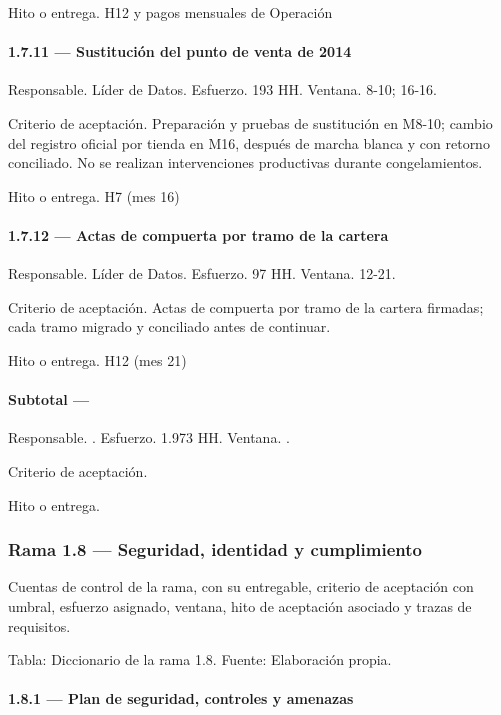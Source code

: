\documentclass[11pt]{article}
\begin{document}
Hito o entrega. H12 y pagos mensuales de Operación

\paragraph{1.7.11 — Sustitución del punto de venta de 2014}

Responsable. Líder de Datos. Esfuerzo. 193 HH. Ventana. 8-10; 16-16.

Criterio de aceptación. Preparación y pruebas de sustitución en M8-10; cambio del registro oficial por tienda en M16, después de marcha blanca y con retorno conciliado. No se realizan intervenciones productivas durante congelamientos.

Hito o entrega. H7 (mes 16)

\paragraph{1.7.12 — Actas de compuerta por tramo de la cartera}

Responsable. Líder de Datos. Esfuerzo. 97 HH. Ventana. 12-21.

Criterio de aceptación. Actas de compuerta por tramo de la cartera firmadas; cada tramo migrado y conciliado antes de continuar.

Hito o entrega. H12 (mes 21)

\paragraph{Subtotal — }

Responsable. . Esfuerzo. 1.973 HH. Ventana. .

Criterio de aceptación.

Hito o entrega.

\subsubsection{Rama 1.8 — Seguridad, identidad y cumplimiento}

Cuentas de control de la rama, con su entregable, criterio de aceptación con umbral, esfuerzo asignado, ventana, hito de aceptación asociado y trazas de requisitos.

Tabla: Diccionario de la rama 1.8. Fuente: Elaboración propia.

\paragraph{1.8.1 — Plan de seguridad, controles y amenazas}
\end{document}
